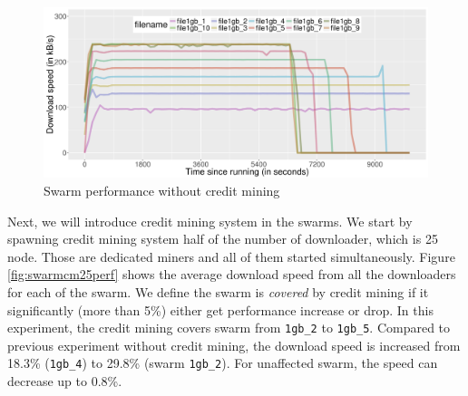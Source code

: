 \begin{figure}[h]
	\centering
	\includegraphics[width=\textwidth]{pics/results/swperf_n2.png}
	\caption{Swarm performance without credit mining}
	\label{fig:swarmnocmperf}
\end{figure}


Next, we will introduce credit mining system in the swarms. We start by spawning credit mining system half of the number of downloader, which is 25 node. Those are dedicated miners and all of them started simultaneously. Figure \ref{fig:swarmcm25perf} shows the average download speed from all the downloaders for each of the swarm. We define the swarm is \textit{covered} by credit mining if it significantly (more than 5\%) either get performance increase or drop. In this experiment, the credit mining covers swarm from \texttt{1gb\_2} to \texttt{1gb\_5}. Compared to previous experiment without credit mining, the download speed is increased from 18.3\% (\texttt{1gb\_4}) to 29.8\% (swarm \texttt{1gb\_2}). For unaffected swarm, the speed can decrease up to 0.8\%.

